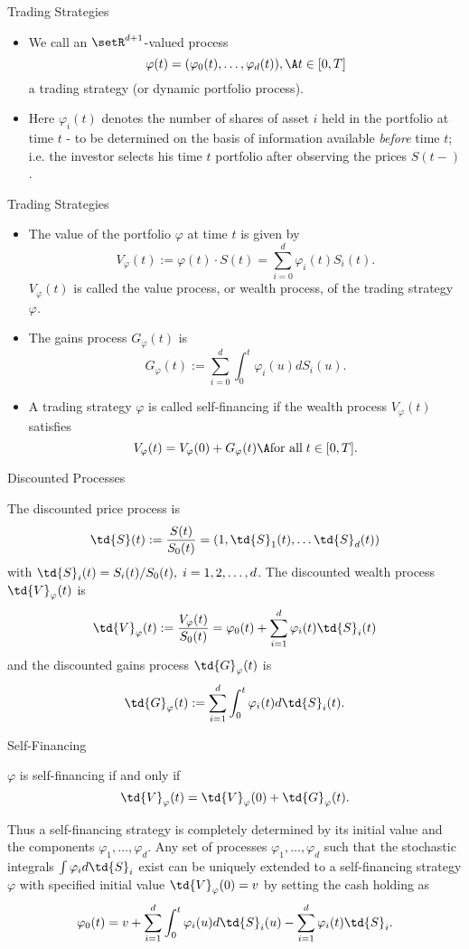 { Trading Strategies}

\begin{itemize}
\item<1->  We call an $\setR^{d+1}$-valued process
$$
\varphi(t) = (\varphi_0(t), \ldots, \varphi_d(t)), \A t \in [0,T]
$$
a trading strategy (or dynamic portfolio process).
\item<2->
Here $\varphi_i(t)$ denotes the number of shares of asset $i$ held
in the portfolio at time $t$ - to be determined on the basis of
information available {\it before} time $t$; i.e. the investor
selects his time $t$ portfolio after observing the prices $S(t-)$.
\end{itemize}


{ Trading Strategies}
\begin{itemize}
\item<1->  The value of the portfolio $\varphi$ at time $t$ is
given by
$$
V_\varphi(t) :=  \varphi(t) \cdot S(t) = \sum_{i=0}^d \varphi_i(t)
S_i(t).
$$
$V_\varphi(t)$ is called the value process, or wealth process, of
the trading strategy $\varphi$.\ \item<2-> The gains process
$G_\varphi(t)$ is
$$
G_\varphi(t) := \sum_{i=0}^d \int_0^t \varphi_i(u) dS_i(u).
$$
\item<3-> A trading strategy $\varphi$ is called self-financing if
the wealth process $V_\varphi(t)$ satisfies
$$
V_\varphi(t) = V_\varphi(0) + G_\varphi(t)\A \mbox{for all}\; t\in
[0,T].
$$
\end{itemize}



{ Discounted Processes}

The discounted price process is
$$
\td{S}(t) := \frac{S(t)}{S_0(t)} = (1, \td{S}_1(t), \ldots
\td{S}_d(t))
$$
with $\td{S}_i(t) = S_i(t)/S_0(t),\; i=1,2, \ldots, d$. The
discounted wealth process $\td{V}_\varphi(t)$ is
$$
\td{V}_\varphi(t):= \frac{V_\varphi(t)}{S_0(t)} = \varphi_0(t) +
\sum_{i=1}^d \varphi_i(t) \td{S}_i(t)
$$
and the discounted gains process $\td{G}_\varphi(t)$ is
$$
\td{G}_\varphi(t) := \sum_{i=1}^d \int_0^t \varphi_i(t)
d\td{S}_i(t).
$$


{ Self-Financing}

$\varphi$ is self-financing if and only if
$$
\td{V}_\varphi(t) = \td{V}_\varphi(0) + \td{G}_\varphi(t).
$$

Thus a self-financing strategy is completely determined by its
initial value and the components $\varphi_1, \ldots, \varphi_d$.
Any set of processes $\varphi_1, \ldots, \varphi_d$
such that the stochastic integrals $\int \varphi_i d\td{S}_i$
exist can be uniquely extended to a self-financing strategy
$\varphi$ with specified initial value $\td{V}_\varphi(0)= v$ by
setting the cash holding as
$$
\varphi_0(t) = v + \sum_{i=1}^d \int_0^t \varphi_i(u) d\td{S}_i(u)
- \sum_{i=1}^d \varphi_i(t) \td{S}_i.
$$


